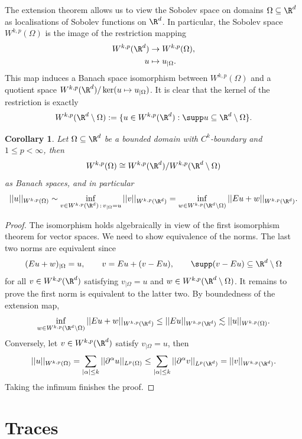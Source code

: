 \documentclass[reqno]{amsart}
\newtheorem{corollary}[theorem]{Corollary}
\theoremstyle{definition}
\theoremstyle{remark}
\begin{document}
The extension theorem allows us to view the Sobolev space on domains $\Omega \subseteq \R^d$ as localisations of Sobolev functions on $\R^d$. In particular, the Sobolev space $W^{k, p} (\Omega)$ is the image of the restriction mapping 
	\begin{align*}
		W^{k, p} (\R^d) 
			&\to W^{k, p} (\Omega),\\
		u
			&\mapsto u_{|\Omega}.	
	\end{align*}
This map induces a Banach space isomorphism between $W^{k, p} (\Omega)$ and a quotient space $W^{k, p} (\R^d)/\ker (u \mapsto u_{|\Omega})$. It is clear that the kernel of the restriction is exactly 
	\[  W^{k, p} (\R^d \setminus \Omega) := \{ u \in W^{k, p} (\R^d) : \supp u \subseteq \R^d \setminus \Omega \}. \]

\begin{corollary}
	Let $\Omega \subseteq \R^d$ be a bounded domain with $C^k$-boundary and $1 \leq p < \infty$, then 
		\[ W^{k, p} (\Omega) \cong W^{k, p} (\R^d) / W^{k, p} (\R^d \setminus \Omega) \]
	as Banach spaces, and in particular
		\[ ||u||_{W^{k, p} (\Omega)} \sim \inf_{v \in W^{k, p} (\R^d) \, : \, v_{|\Omega} = u} ||v||_{W^{k, p} (\R^d)} = \inf_{w \in W^{k, p} (\R^d \setminus \Omega)} || Eu + w ||_{W^{k, p} (\R^d)} . \]	
\end{corollary}

\begin{proof}
	The isomorphism holds algebraically in view of the first isomorphism theorem for vector spaces. We need to show equivalence of the norms. The last two norms are equivalent since 
		\[ (Eu + w)_{|\Omega} = u, \qquad v = Eu + (v - Eu), \qquad \supp (v - Eu) \subseteq \R^d \setminus \Omega \] 
	for all $v \in W^{k, p} (\R^d)$ satisfying $v_{|\Omega} = u$ and $w \in W^{k, p} (\R^d \setminus \Omega)$. It remains to prove the first norm is equivalent to the latter two. By boundedness of the extension map, 
		\[ \inf_{w \in W^{k, p} (\R^d \setminus \Omega)} ||Eu + w||_{W^{k, p} (\R^d)} \leq ||Eu||_{W^{k, p} (\R^d)} \lesssim ||u||_{W^{k, p} (\Omega)} .\]
	Conversely, let $v \in W^{k, p} (\R^d)$ satisfy $v_{|\Omega} = u$, then 
		\[ ||u||_{W^{k, p} (\Omega)} = \sum_{|\alpha| \leq k} ||\partial^\alpha u||_{L^p (\Omega)} \leq  \sum_{|\alpha| \leq k} ||\partial^\alpha v||_{L^p (\R^d)} = ||v||_{W^{k, p} (\R^d)}.  \]
	Taking the infimum finishes the proof. 		
\end{proof}

\section{Traces}
\end{document}
